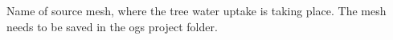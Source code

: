 Name of source mesh, where the tree water uptake is taking place. The mesh needs to be saved in the ogs project folder. 